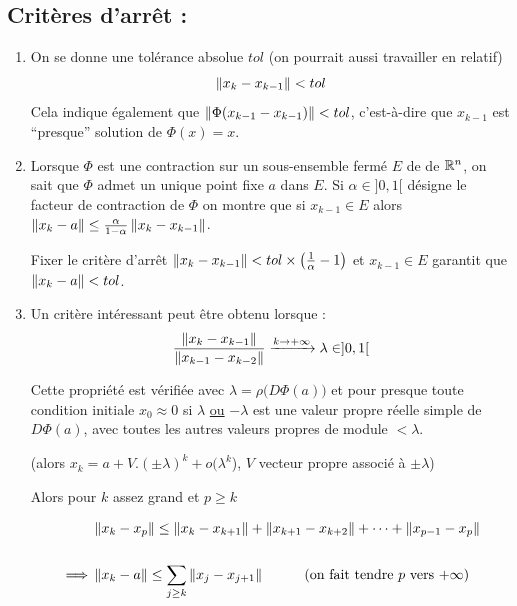 \subsection*{Critères d'arrêt :}
\begin{enumerate}[label=\alph*)]
    \item
        On se donne une tolérance absolue $tol$ (on pourrait aussi travailler en relatif)
        \[
              \left\lVert x_k - x_{k-1}\right\rVert < tol
        \]
        Cela indique également que $\left\lVert\Phi(x_{k-1} - x_{k-1})\right\rVert < tol$,
        c'est-à-dire que $x_{k-1}$ est ``presque'' solution de $\Phi(x) = x$.
        
    \item Lorsque $\Phi$ est une contraction sur un sous-ensemble fermé $E$ de
          de $\mathbb{R}^n$, on sait que $\Phi$ admet un unique point fixe $a$ dans $E$.
          Si $\alpha \in ]0,1[$ désigne le facteur de contraction de $\Phi$ on
          montre que si $x_{k-1} \in E$ alors $\left\lVert x_k-a\right\rVert \leq \frac{\alpha}{1-\alpha} \left\lVert x_k - x_{k-1}\right\rVert$.
          
          Fixer le critère d'arrêt $\left\lVert x_k - x_{k-1}\right\rVert < tol \times \big(\frac{1}{\alpha} - 1 \big)$ et $x_{k-1} \in E$ garantit que $\left\lVert x_k - a\right\rVert < tol$.


    \item Un critère intéressant peut être obtenu lorsque :
        \[
        \frac{\left\lVert x_k - x_{k-1}\right\rVert}{\left\lVert x_{k-1}-x_{k-2}\right\rVert} \xrightarrow{k\to+\infty} \lambda \in ]0,1[ 
        \]

        Cette propriété est vérifiée avec $\lambda = \rho \big(D\Phi(a) \big)$ et pour
        presque toute condition initiale $x_0 \approx 0$ si $\lambda$ \underline{ou} $-\lambda$
        est une valeur propre réelle simple de $D\Phi(a)$, avec toutes les autres
        valeurs propres de module $< \lambda$.

        (alors $x_k = a + V.(\pm \lambda)^k + o(\lambda^k$), $V$ vecteur propre
        associé à $\pm \lambda$)

        Alors pour $k$ assez grand et $p \geq k$

        \begin{align*}
            & \left\lVert x_k - x_p\right\rVert \leq \left\lVert x_k - x_{k+1}\right\rVert + \left\lVert x_{k+1} - x_{k+2}\right\rVert
            + \dots + \left\lVert x_{p-1}-x_p\right\rVert \\ 
            \\
            \implies & \left\lVert x_k - a\right\rVert \leq \sum_{j \geq k} \left\lVert x_j - x_{j+1}\right\rVert \hspace{1cm} \text{(on fait tendre $p$ vers $+\infty$)}
        \end{align*}
        

\end{enumerate}
